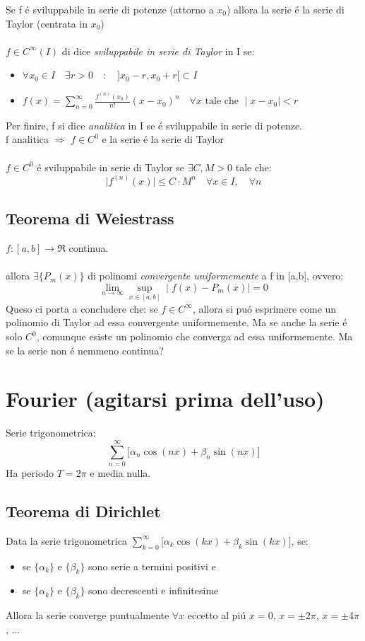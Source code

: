 \documentclass[a4paper,10pt,italian]{article}
\begin{document}
Se f \'e sviluppabile in serie di potenze (attorno a $x_0$) allora la serie \'e la serie di Taylor (centrata in $x_0$) \\ \\
$f \in C^\infty(I)$ di dice \emph{sviluppabile in serie di Taylor} in I se:
\begin{itemize} 
\item $\forall x_0 \in I \quad \exists r>0 \quad : \quad ]x_0-r, x_0+r[ \subset I$ 
\item $f(x)=\sum_{n=0}^{\infty}\frac{f^{(n)}(x_0)}{n!}(x-x_0)^n \quad \forall x \mbox{ tale che } \mid x-x_0 \mid < r$
\end{itemize}
Per finire, f si dice \emph{analitica} in I se \'e sviluppabile in serie di potenze.\\
f analitica $\Rightarrow$ $f \in C^0$ e la serie \'e la serie di Taylor \\ \\ 
$f \in C^0$ \'e sviluppabile in serie di Taylor se $\exists C,M > 0$ tale che:
$$ \mid f^{(n)}(x) \mid \leq C \cdot M^n \quad \forall x \in I, \quad \forall n $$

\subsection{Teorema di Weiestrass}
$ f:[a,b] \rightarrow \Re $ continua. \\ \\
allora $\exists \{ P_m(x)\}$ di polinomi \emph{convergente uniformemente} a f in [a,b], ovvero:
$$ \lim_{n\rightarrow \infty} \sup_{x\in [a,b]} \mid f(x) - P_m(x) \mid = 0 $$
Queso ci porta a concludere che: se $f\in C^\infty$, allora si pu\'o esprimere come un polinomio di Taylor ad
essa convergente uniformemente. Ma se anche la serie \'e solo $C^0$, comunque esiste un polinomio che converga
ad essa uniformemente. Ma se la serie non \'e nemmeno continua?

\section{Fourier (agitarsi prima dell'uso)}
Serie trigonometrica:
$$ \sum_{n=0}^{\infty}\Bigr[ \alpha _n \cos(nx) + \beta _n \sin(nx)  \Bigr] $$
Ha periodo $T = 2\pi$ e media nulla.

\subsection{Teorema di Dirichlet}
Data la serie trigonometrica $ \sum_{k=0}^{\infty}\Bigr[ \alpha _k \cos(kx) + \beta _k \sin(kx)  \Bigr]$, se:
\begin{itemize}
\item se $\{\alpha _k\}$ e $\{\beta _k\}$ sono serie a termini positivi e
\item se $\{\alpha _k\}$ e $\{\beta _k\}$ sono decrescenti e infinitesime
\end{itemize}
Allora la serie converge puntualmente $\forall x$ eccetto al pi\'u $x=0$, $x=\pm 2 \pi$, $x= \pm 4 \pi$, ...
\end{document}
